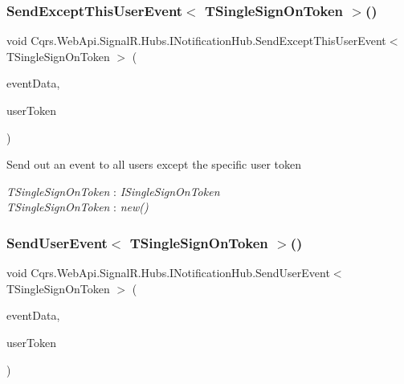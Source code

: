 \subsubsection{\texorpdfstring{Send\+Except\+This\+User\+Event$<$ T\+Single\+Sign\+On\+Token $>$()}{SendExceptThisUserEvent< TSingleSignOnToken >()}}
{\footnotesize\ttfamily void Cqrs.\+Web\+Api.\+Signal\+R.\+Hubs.\+I\+Notification\+Hub.\+Send\+Except\+This\+User\+Event$<$ T\+Single\+Sign\+On\+Token $>$ (\begin{DoxyParamCaption}\item[{\hyperlink{interfaceCqrs_1_1Events_1_1IEvent}{I\+Event}$<$ T\+Single\+Sign\+On\+Token $>$}]{event\+Data,  }\item[{string}]{user\+Token }\end{DoxyParamCaption})}



Send out an event to all users except the specific user token 

\begin{Desc}
\item[Type Constraints]\begin{description}
\item[{\em T\+Single\+Sign\+On\+Token} : {\em I\+Single\+Sign\+On\+Token}]\item[{\em T\+Single\+Sign\+On\+Token} : {\em new()}]\end{description}
\end{Desc}
\mbox{\label{interfaceCqrs_1_1WebApi_1_1SignalR_1_1Hubs_1_1INotificationHub_a34b0fc54fd594e3b9946521beb9bc8ee}} 
\subsubsection{\texorpdfstring{Send\+User\+Event$<$ T\+Single\+Sign\+On\+Token $>$()}{SendUserEvent< TSingleSignOnToken >()}}
{\footnotesize\ttfamily void Cqrs.\+Web\+Api.\+Signal\+R.\+Hubs.\+I\+Notification\+Hub.\+Send\+User\+Event$<$ T\+Single\+Sign\+On\+Token $>$ (\begin{DoxyParamCaption}\item[{\hyperlink{interfaceCqrs_1_1Events_1_1IEvent}{I\+Event}$<$ T\+Single\+Sign\+On\+Token $>$}]{event\+Data,  }\item[{string}]{user\+Token }\end{DoxyParamCaption})}



